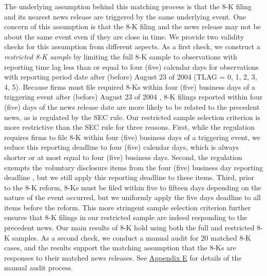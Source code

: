 \documentclass[a4paper]{article}
\begin{document}
\begin{spacing}{2}
The underlying assumption behind this matching process is that the 8-K filing and its nearest news release are triggered by the same underlying event. One concern of this assumption is that the 8-K filing and the news release may not be about the same event even if they are close in time. We provide two validity checks for this assumption from different aspects. As a first check, we construct a \textit{restricted 8-K sample} by limiting the full 8-K sample to observations with reporting time lag less than or equal to four (five) calendar days for observations with reporting period date after (before) August 23 of 2004 (TLAG = 0, 1, 2, 3, 4, 5). Because firms must file required 8-Ks within four (five) business days of a triggering event after (before) August 23 of 2004 , 8-K filings reported within four (five) days of the news release date are more likely to be related to the precedent news, as is regulated by the SEC rule. Our restricted sample selection criterion is more restrictive than the SEC rule for three reasons. First, while the regulation requires firms to file 8-K within four (five) business days of a triggering event, we reduce this reporting deadline to four (five) calendar days, which is always shorter or at most equal to four (five) business days. Second, the regulation exempts the voluntary disclosure items from the four (five) business day reporting deadline \cite{heMeasuringDisclosureUsing2020}, but we still apply this reporting deadline to these items. Third, prior to the 8-K reform, 8-Ks must be filed within five to fifteen days depending on the nature of the event occurred, but we uniformly apply the five days deadline to all items before the reform. This more stringent sample selection criterion further ensures that 8-K filings in our restricted sample are indeed responding to the precedent news. Our main results of 8-K hold using both the full and restricted 8-K samples. As a second check, we conduct a manual audit for 20 matched 8-K cases, and the results support the matching assumption that the 8-Ks are responses to their matched news releases. See \hyperref[appe]{Appendix E} for details of the manual audit process.


\end{spacing}
\end{document}
